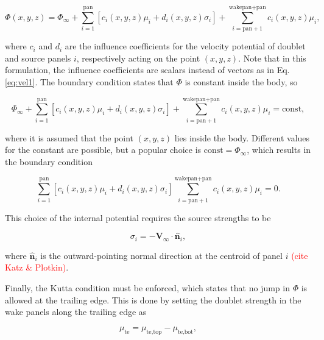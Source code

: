 \documentclass[11pt]{article}
\begin{document}
\begin{equation}
\Phi(x,y,z) = \Phi_\infty
            + \sum_{i=1}^{\text{pan}}\left[c_i(x,y,z)\mu_i + d_i(x,y,z)\sigma_i\right]
            + \sum_{i=\text{pan}+1}^{\text{wakepan}+\text{pan}}c_i(x,y,z)\mu_i,
\label{eq:phi2}
\end{equation}

\noindent where $c_i$ and $d_i$ are the influence coefficients for the velocity potential
of doublet and source panels $i$, respectively acting on the point $(x,y,z)$. Note that in
this formulation, the influence coefficients are scalars instead of vectors as in Eq.
\ref{eq:vel1}. The boundary
condition states that $\Phi$ is constant inside the body, so

\begin{equation}
   \Phi_\infty
 + \sum_{i=1}^{\text{pan}}\left[c_i(x,y,z)\mu_i + d_i(x,y,z)\sigma_i\right]
 + \sum_{i=\text{pan}+1}^{\text{wakepan}+\text{pan}}c_i(x,y,z)\mu_i = \text{const},
\label{eq:phi3}
\end{equation}

\noindent where it is assumed that the point $(x,y,z)$ lies inside the body. Different
values for the constant are possible, but a popular choice is $\text{const} =
\Phi_\infty$, which results in the boundary condition

\begin{equation}
\sum_{i=1}^{\text{pan}}\left[c_i(x,y,z)\mu_i + d_i(x,y,z)\sigma_i\right]
\sum_{i=\text{pan}+1}^{\text{wakepan}+\text{pan}}c_i(x,y,z)\mu_i = 0.
\label{eq:phi4}
\end{equation}

This choice of the internal potential requires the source strengths to be

\begin{equation}
\sigma_i = -\mathbf{V}_\infty\cdot\mathbf{\hat{n}}_i,
\label{eq:sigma1}
\end{equation}

\noindent where $\mathbf{\hat{n}}_i$ is the outward-pointing normal direction at
the centroid of panel $i$ \textcolor{red}{(cite Katz \& Plotkin)}.

Finally, the Kutta condition must be enforced, which states that no jump in $\Phi$ is
allowed at the trailing edge. This is done by setting the doublet strength in the wake
panels along the trailing edge as

\begin{equation}
\mu_{\text{te}} = \mu_{\text{te,top}} - \mu_{\text{te,bot}},
\label{eq:wake_strength}
\end{equation}
\end{document}
